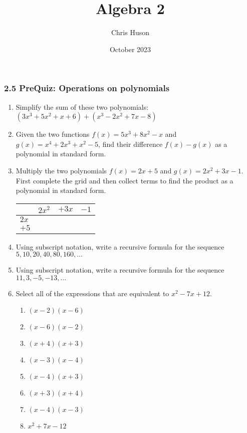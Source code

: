 \documentclass[12pt, twoside]{article}
\title{Algebra 2}
\author{Chris Huson}
\date{October 2023}
\begin{document}
\subsubsection*{2.5 PreQuiz: Operations on polynomials}
\begin{enumerate}

\item Simplify the sum of these two polynomials: $(3x^3+5x^2+x+6)+(x^3-2x^2+7x-8)$ \vspace{2cm}

\item Given the two functions $f(x)=5x^3+8x^2-x$ and $g(x)=x^4+2x^3+x^2-5$, find their difference $f(x)-g(x)$ as a polynomial in standard form. \vspace{3cm}

\item Multiply the two polynomials $f(x)=2x+5$ and $g(x)=2x^2+3x-1$. First complete the grid and then collect terms to find the product as a polynomial in standard form. \\[0.25cm]
\begin{tabular}{|p{1cm}|p{3cm}|p{3cm}|p{3cm}|}
    \hline
     & $2x^2$ & $+3x$ & $-1$ \\
    \hline
    $2x$ &  & & \\[0.5cm]
    \hline
    $+5$ &  & & \\[0.5cm]
    \hline
\end{tabular} \vspace{4cm}

\item Using subscript notation, write a recursive formula for the sequence $5, 10, 20, 40, 80, 160, \dots$ \vspace{2cm}

\item Using subscript notation, write a recursive formula for the sequence $11, 3, -5, -13, \dots$ 

\newpage
\item Select all of the expressions that are equivalent to $x^2-7x+12$.
    \begin{multicols}{2}
    \begin{enumerate}
        \item $(x-2)(x-6)$
        \item $(x-6)(x-2)$ 
        \item $(x+4)(x+3)$ 
        \item $(x-3)(x-4)$ 
        \item $(x-4)(x+3)$
        \item $(x+3)(x+4)$ 
        \item $(x-4)(x-3)$
        \item $x^2+7x-12$
    \end{enumerate} 
    \end{multicols}
    \vspace{0.25cm}


\end{enumerate}
\end{document}
